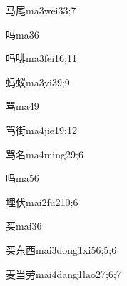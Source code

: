 \begin{verbete}{马尾}{ma3wei3}{3;7}
\end{verbete}

\begin{verbete}{吗}{ma3}{6}
\end{verbete}

\begin{verbete}{吗啡}{ma3fei1}{6;11}
\end{verbete}

\begin{verbete}{蚂蚁}{ma3yi3}{9;9}
\end{verbete}

\begin{verbete}{骂}{ma4}{9}
\end{verbete}

\begin{verbete}{骂街}{ma4jie1}{9;12}
\end{verbete}

\begin{verbete}{骂名}{ma4ming2}{9;6}
\end{verbete}

\begin{verbete}{吗}{ma5}{6}
\end{verbete}

\begin{verbete}{埋伏}{mai2fu2}{10;6}
\end{verbete}

\begin{verbete}{买}{mai3}{6}
\end{verbete}

\begin{verbete}{买东西}{mai3dong1xi5}{6;5;6}
\end{verbete}

\begin{verbete}{麦当劳}{mai4dang1lao2}{7;6;7}
\end{verbete}

